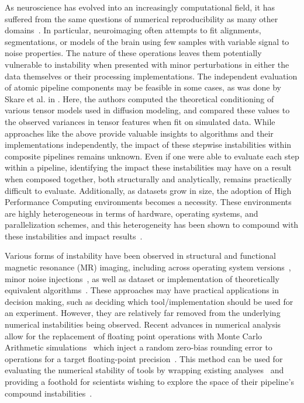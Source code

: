 \documentclass[fleqn,12pt]{SelfArx_ch} %
\begin{document}
As neuroscience has evolved into an increasingly computational field, it has suffered from the same questions of
numerical reproducibility as many other domains~\cite{Baker2016-en}. In particular, neuroimaging often attempts to fit
alignments, segmentations, or models of the brain using few samples with variable signal to noise properties. The
nature of these operations leaves them potentially vulnerable to instability when presented with minor perturbations in
either the data themselves or their processing implementations. The independent evaluation of atomic pipeline
components may be feasible in some cases, as was done by Skare et al. in \cite{Skare2000-sl}. Here, the authors
computed the theoretical conditioning of various tensor models used in diffusion modeling, and compared these values to
the observed variances in tensor features when fit on simulated data. While approaches like the above provide valuable
insights to algorithms and their implementations independently, the impact of these stepwise instabilities within
composite pipelines remains unknown. Even if one were able to evaluate each step within a pipeline, identifying the
impact these instabilities may have on a result when composed together, both structurally and analytically, remains
practically difficult to evaluate. Additionally, as datasets grow in size, the adoption of High Performance Computing
environments becomes a necessity. These environments are highly heterogeneous in terms of hardware, operating systems,
and parallelization schemes, and this heterogeneity has been shown to compound with these instabilities and impact
results~\cite{Glatard2015-vc}.

Various forms of instability have been observed in structural and functional magnetic resonance (MR) imaging, including
across operating system versions~\cite{Glatard2015-vc}, minor noise injections~\cite{Lewis2017-ll}, as well as dataset
or implementation of theoretically equivalent algorithms~\cite{Bowring2018-ed,Klein2009-bl}. These approaches may have
practical applications in decision making, such as deciding which tool/implementation should be used for an experiment.
However, they are relatively far removed from the underlying numerical instabilities being observed. Recent advances in
numerical analysis allow for the replacement of floating point operations with Monte Carlo Arithmetic
simulations~\cite{Parker1997-qq} which inject a random zero-bias rounding error to operations for a target
floating-point precision~\cite{Parker1997-qq, Frechtling2015-cd}. This method can be used for evaluating the numerical
stability of tools by wrapping existing analyses~\cite{Frechtling2015-cd} and providing a foothold for scientists
wishing to explore the space of their pipeline's compound instabilities~\cite{Denis2016-wo}.
\end{document}
